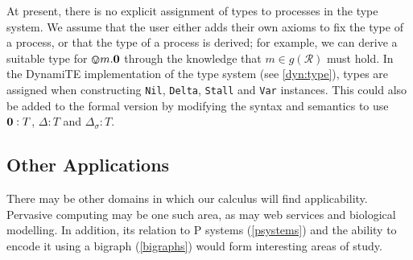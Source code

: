 At present, there is no explicit assignment of types to processes in
the type system.  We assume that the user either adds their own axioms
to fix the type of a process, or that the type of a process is
derived; for example, we can derive a suitable type for
$\varovee m.\textbf{0}$ through the knowledge that $m \in g(\mathscr{R})$
must hold.  In the DynamiTE implementation of the type system (see
\ref{dyn:type}), types are assigned when constructing \texttt{Nil},
\texttt{Delta}, \texttt{Stall} and \texttt{Var} instances.  This could
also be added to the formal version by modifying the syntax and
semantics to use $\textbf{0} : T$, $\Delta : T$ and $\Delta_\sigma : T$.

\subsection{Other Applications}
\label{future:apps}

There may be other domains in which our calculus will find
applicability.  Pervasive computing may be one such area, as may web
services and biological modelling.  In addition, its relation to P
systems (\ref{psystems}) and the ability to encode it using a bigraph
(\ref{bigraphs}) would form interesting areas of study.

